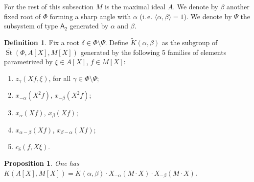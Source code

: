 \documentclass[oneside, 8pt]{amsart}
\newtheorem{prop}[lemma]{Proposition}
\theoremstyle{remark}
\theoremstyle{definition}
\numberwithin{lemma}{section}
\numberwithin{prop}{section}
\numberwithin{corollary}{section}
\numberwithin{externaltheorem}{section}
\newtheorem{df}[lemma]{Definition} \Crefname{df}{Definition}{Definitions}
\DeclareMathOperator{\St}{St}
\newcommand{\rA}{\mathsf{A}}
\numberwithin{equation}{section}
\begin{document}
For the rest of this subsection $M$ is the maximal ideal $A$.
We denote by $\beta$ another fixed root of $\Phi$ forming a sharp angle with $\alpha$ (i.\,e. $\langle \alpha, \beta \rangle = 1$). We denote by $\Psi$ the subsystem of type $\rA_2$ generated by $\alpha$ and $\beta$.
\begin{df}\label{def:Kab} 
Fix a root $\delta \in \Phi \setminus \Psi$. Define $\widetilde{K}(\alpha, \beta)$ as the subgroup of $\overline{\St}(\Phi, A[X], M[X])$ generated by the following 5 families of elements parametrized by $\xi \in A[X]$, $f\in M[X]$:
 \begin{enumerate}[label=(K\arabic*)]
  \item $z_\gamma(Xf, \xi)$, for all $\gamma \in \Phi \setminus \Psi$;
  \item $x_{-\alpha}(X^2f)$, $x_{-\beta}(X^2f)$;
  \item $x_{\alpha}(Xf)$, $x_\beta(Xf)$;
  \item $x_{\alpha-\beta}(Xf)$, $x_{\beta-\alpha}(Xf)$;
  \item $c_{\delta}(f, X\xi)$. \end{enumerate} \end{df}
\begin{prop} \label{K-a-b} One has $K(A[X], M[X]) = \widetilde{K}(\alpha, \beta) \cdot X_{-\alpha}(M \cdot X) \cdot X_{-\beta}(M \cdot X)$. 
\end{prop} 
\end{document}
